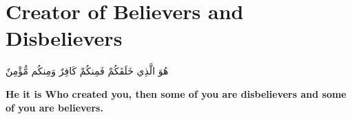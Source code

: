 \chapter{Creator of Believers and Disbelievers}
\begin{center}
    {\Huge    
        \begin{Arabic}
            هُوَ الَّذِي خَلَقَكُمْ فَمِنكُمْ كَافِرٌ وَمِنكُم مُّؤْمِنٌ
        \end{Arabic}
    }
\end{center}
\vspace*{\fill}
\vspace{3cm}
\begin{center}
    \large \textbf{He it is Who created you, then some of you are disbelievers and some of you are believers.}
\end{center}
